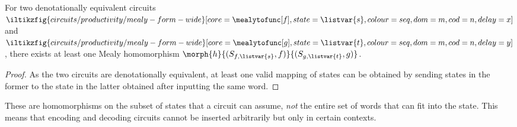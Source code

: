 \begin{proposition}
    For two denotationally equivalent circuits \(
    \iltikzfig{circuits/productivity/mealy-form-wide}[core=\mealytofunc[f],state=\listvar{s},colour=seq,dom=m,cod=n,delay=x]
    \) and \(
    \iltikzfig{circuits/productivity/mealy-form-wide}[core=\mealytofunc[g],state=\listvar{t},colour=seq,dom=m,cod=n,delay=y]
    \), there exists at least one Mealy homomorphism \(
    \morph{h}{(S_{f,\listvar{s}},f)}{(S_{g,\listvar{t}},g)}
    \).
\end{proposition}
\begin{proof}
    As the two circuits are denotationally equivalent, at least one valid
    mapping of states can be obtained by sending states in the former to the
    state in the latter obtained after inputting the same word.
\end{proof}

These are homomorphisms on the subset of states that a circuit
can assume, \emph{not} the entire set of words that can fit into the state.
This means that encoding and decoding circuits cannot be inserted arbitrarily
but only in certain contexts.

